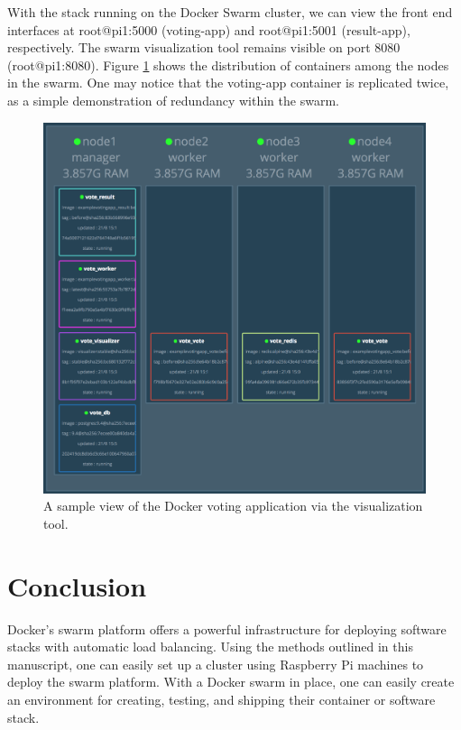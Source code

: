 \documentclass[sigconf]{acmart}
\begin{document}
\setlength{\parskip}{1em}\noindent With the stack running on the Docker Swarm cluster, we can view the front end interfaces at root@pi1:5000 (voting-app) and root@pi1:5001 (result-app), respectively. The swarm visualization tool remains visible on port 8080 (root@pi1:8080). Figure \ref{f:votingApp2} shows the distribution of containers among the nodes in the swarm. One may notice that the voting-app container is replicated twice, as a simple demonstration of redundancy within the swarm.
\begin{figure}[!ht]
  \centering\includegraphics[width=\columnwidth]{images/votingApp2.png}
  \caption{A sample view of the Docker voting application via the  visualization tool.}\label{f:votingApp2}
\end{figure}

\section{Conclusion}

Docker's swarm platform offers a powerful infrastructure for deploying software stacks with automatic load balancing. Using the methods outlined in this manuscript, one can easily set up a cluster using Raspberry Pi machines to deploy the swarm platform. With a Docker swarm in place, one can easily create an environment for creating, testing, and shipping their container or software stack.
\end{document}
